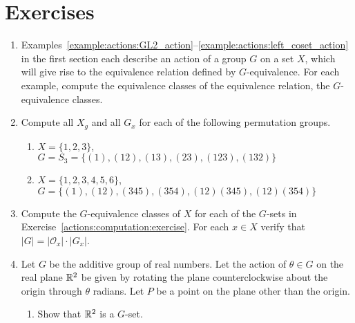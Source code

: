  
 
\section*{Exercises}
\exrule
 
 
 
 
{\small
\begin{enumerate}
 

\item
Examples~\ref{example:actions:GL2_action}--\ref{example:actions:left_coset_action}  in the first section each describe an action of a group $G$ on a set $X$, which will give rise to the equivalence relation defined by $G$-equivalence.  For each example, compute the equivalence classes of the equivalence relation,  the {\bfi $G$-equivalence classes\/}.
 
 
\item \label{actions:computation:exercise}
Compute all $X_g$ and all $G_x$ for each of the following permutation
groups. 
\begin{enumerate}
 
 \item
$X= \{1, 2, 3\}$, \\
$G=S_3=\{(1), (12), (13), (23), (123), (132)  \}$
 
 \item
$X = \{1, 2, 3, 4, 5, 6\}$, \\
$G = \{(1), (12), (345), (354), (12)(345), (12)(354)  \}$
 
\end{enumerate}
 
 
\item
Compute the $G$-equivalence classes of $X$ for each of the $G$-sets in
Exercise~\ref{actions:computation:exercise}. For each $x \in X$ verify that $|G|=|{\mathcal O}_x| \cdot
|G_x|$.  
 
 
\item
Let $G$ be the additive group of real numbers. Let the action of
$\theta \in G$ on the real plane ${\Bbb R}^2$ be given by rotating the
plane counterclockwise about the origin through $\theta$ radians. Let
$P$ be a point on the plane other than the origin.
\begin{enumerate}
 
 \item
Show that ${\Bbb R}^2$ is a $G$-set.
 

\end{enumerate}
\end{enumerate}}
